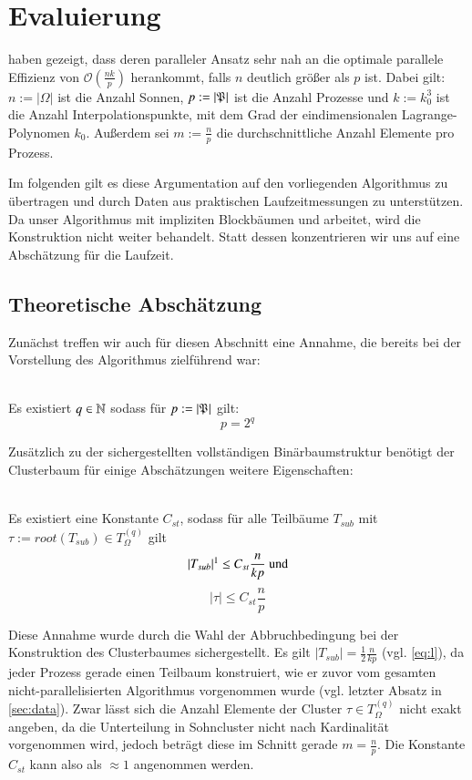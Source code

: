 \chapter{Evaluierung}
\label{chp:eval}
  \citet{distrh2} haben gezeigt, dass deren paralleler Ansatz sehr nah an die optimale parallele Effizienz von $\mathcal{O}(\frac{nk}{p})$ herankommt, falls $n$ deutlich größer als $p$ ist.
  Dabei gilt: $n := |\Omega|$ ist die Anzahl Sonnen, $p := |\mathfrak{P}|$ ist die Anzahl Prozesse und $k := k_0^3$ ist die Anzahl Interpolationspunkte, mit dem Grad der eindimensionalen Lagrange-Polynomen 
  $k_0$. Außerdem sei $m := \frac{n}{p}$ die durchschnittliche Anzahl Elemente pro Prozess.
  
  Im folgenden gilt es diese Argumentation auf den vorliegenden Algorithmus zu übertragen und durch Daten aus praktischen Laufzeitmessungen zu unterstützen. Da unser Algorithmus mit impliziten
  Blockbäumen und \hquad arbeitet, wird die Konstruktion nicht weiter behandelt. Statt dessen konzentrieren wir uns auf eine Abschätzung für die Laufzeit.
  
  \section{Theoretische Abschätzung}
  \label{sec:theo}
  
  Zunächst treffen wir auch für diesen Abschnitt eine Annahme, die bereits bei der Vorstellung des Algorithmus zielführend war:
  \begin{ann} \ \\
  \label{ann:nodes}
    Es existiert $q \in \mathbb{N}$ sodass für $p := \left| \mathfrak{P} \right|$ gilt:
    \[ p = 2^q \]
  \end{ann}
  
  Zusätzlich zu der sichergestellten vollständigen Binärbaumstruktur benötigt der Clusterbaum für einige Abschätzungen weitere Eigenschaften:
  
  \begin{ann} \ \\
  \label{ann:tree}
    Es existiert eine Konstante $C_{st}$, sodass für alle Teilbäume $T_{sub}$ mit $\tau := root(T_{sub}) \in T_\Omega^{(q)}$ gilt
    \[
     |T_{sub}|\footnotemark \leq C_{st} \frac{n}{kp} \text{ und}
    \]
    \[
     |\tau| \leq C_{st}\frac{n}{p}
    \]
  \end{ann}
  
  Diese Annahme wurde durch die Wahl der Abbruchbedingung bei der Konstruktion des Clusterbaumes sichergestellt. Es gilt $|T_{sub}| = \frac{1}{2} \frac{n}{kp}$ (vgl. \autoref{eq:l}),
  da jeder Prozess gerade einen Teilbaum konstruiert, wie er zuvor vom gesamten nicht-parallelisierten Algorithmus vorgenommen wurde (vgl. letzter Absatz in \autoref{sec:data}). Zwar lässt sich die
  Anzahl Elemente der Cluster $\tau \in T_\Omega^{(q)}$ nicht exakt angeben, da die Unterteilung in Sohncluster nicht nach Kardinalität vorgenommen wird, jedoch beträgt diese im Schnitt gerade 
  $m = \frac{n}{p}$. Die Konstante $C_{st}$ kann also als $\approx 1$ angenommen werden.
  
